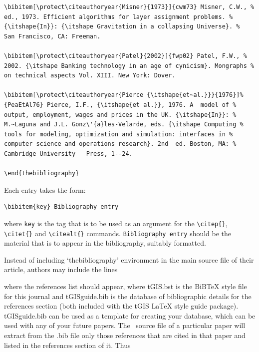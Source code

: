 \documentclass[]{tGIS2e}
\begin{document}
\begin{verbatim}
\bibitem[\protect\citeauthoryear{Misner}{1973}]{cwm73} Misner, C.W., %
ed., 1973. Efficient algorithms for layer assignment problems. %
{\itshape{In}}: {\itshape Gravitation in a collapsing Universe}. %
San Francisco, CA: Freeman.

\bibitem[\protect\citeauthoryear{Patel}{2002}]{fwp02} Patel, F.W., %
2002. {\itshape Banking technology in an age of cynicism}. Mongraphs %
on technical aspects Vol. XIII. New York: Dover.

\bibitem[\protect\citeauthoryear{Pierce {\itshape{et~al.}}}{1976}]%
{PeaEtAl76} Pierce, I.F., {\itshape{et al.}}, 1976. A  model of %
output, employment, wages and prices in the UK. {\itshape{In}}: %
M.~Laguna and J.L. Gonz\'{a}les-Velarde, eds. {\itshape Computing %
tools for modeling, optimization and simulation: interfaces in %
computer science and operations research}. 2nd  ed. Boston, MA: %
Cambridge University   Press, 1--24.

\end{thebibliography}

\end{verbatim}
\medskip
\noindent Each entry takes the form:
\medskip
\begin{verbatim}
\bibitem{key} Bibliography entry
\end{verbatim}

where {\tt key} is the tag that is to be used as an argument for the
\verb"\citep{}", \verb"\citet{}" and \verb"\citealt{}" commands.
{\tt Bibliography entry} should be the material that is to appear in
the bibliography, suitably formatted.\bigskip

Instead of including `thebibliography' environment in the main
source file of their article, authors may include the lines
\vspace{12pt}

\noindent\verb""
\newline\verb""
\vspace{12pt}

\noindent where the references list should appear, where tGIS.bst is
the BiBTeX style file for this journal and tGISguide.bib is the
database of bibliographic details for the references section (both
included with the tGIS LaTeX style guide package). tGISguide.bib can
be used as a template for creating your database, which can be used
with any of your future papers. The \LaTeXe\ source file of a
particular paper will extract from the .bib file only those
references that are cited in that paper and listed in the references
section of it. Thus\vspace{12pt}
\end{document}
